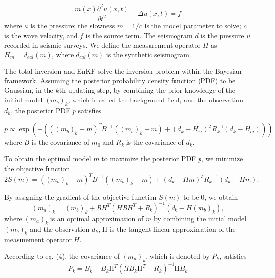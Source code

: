 \documentclass[mreferee]{gji}
\begin{document}
\begin{equation}
\frac{m(x)\partial ^2{u}(x,t)}{\partial{t^2}}-\Delta u(x,t)=f
\end{equation}
where $u$ is the pressure; the slowness $m=1/c$ is the model parameter to solve; $c$ is the wave velocity, and $f$ is the source term. The seismogram $d$ is the pressure $u$ recorded in seismic surveys. We define the measurement operator $H$ as $H_m=d_{cal}(m)$, where $d_{cal}(m)$ is the synthetic seismogram.

The total inversion and EnKF solve the inversion problem within the Bayesian framework. Assuming the posterior probability density function (PDF) to be Gaussian, in the $k$th updating step, by combining the prior knowledge of the initial model $(m_b)_k$, which is called the background field, and the observation $d_k$, the posterior PDF $p$ satisfies


\begin{equation}
p \varpropto \exp\left ( -\left ( \left ( \left ( m_b \right )_k - m \right )^T B^{-1} \left ( \left ( m_b \right )_k -m\right ) +\left ( d_k-H_m \right )^TR_k^{-1}\left ( d_k-H_m \right )\right ) \right )
\end{equation}
where $B$ is the covariance of $m_0$ and $R_k$ is the covariance of $d_k$.

To obtain the optimal model $m$ to maximize the posterior PDF $p$, we minimize the objective function.
\begin{equation}
2S(m)=((m_b)_k-m)^TB^{-1}((m_b)_k-m)+(d_k-Hm)^T{R_k}^{-1}(d_k-Hm).
\end{equation}

By assigning the gradient of the objective function $S(m)$ to be 0, we obtain
\begin{equation}
(m_a)_k=(m_b)_k+BH^T(HBH^T+R_k)^{-1}(d_k-H(m_b)_k),
\end{equation}
where $(m_a)_k$ is an optimal approximation of $m$ by combining the initial model $(m_b)_k$ and the observation $d_k$, H is the tangent linear approximation of the measurement operator $H$.

According to eq. (4), the covariance of $(m_a)_k$, which is denoted by $P_k$, satisfies
\begin{equation}
P_k=B_k-B_k\mbox{H}^T(HB_k\mbox{H}^T+R_k)^{-1}\mbox{H}B_k
\end{equation}
\end{document}
